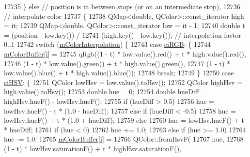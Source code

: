 \begin{DoxyCode}
12735       \} \textcolor{keywordflow}{else} \textcolor{comment}{// position is in between stops (or on an intermediate stop),}
12736              \textcolor{comment}{// interpolate color}
12737       \{
12738         QMap<double, QColor>::const\_iterator high = it;
12739         QMap<double, QColor>::const\_iterator low = it - 1;
12740         \textcolor{keywordtype}{double} t = (position - low.key()) /
12741                    (high.key() - low.key()); \textcolor{comment}{// interpolation factor 0..1}
12742         \textcolor{keywordflow}{switch} (\hyperlink{class_q_c_p_color_gradient_a028cef73d863800a9ee93ffd641cce01}{mColorInterpolation}) \{
12743         \textcolor{keywordflow}{case} \hyperlink{class_q_c_p_color_gradient_ac5dca17cc24336e6ca176610e7f77fc1a5e30f725c9cfe93999e268a9f92afbe7}{ciRGB}: \{
12744           \hyperlink{class_q_c_p_color_gradient_af8b5f0739faa5f8295154d47ce38ecff}{mColorBuffer}[\hyperlink{_comparision_pictures_2_createtest_image_8m_a6f6ccfcf58b31cb6412107d9d5281426}{i}] =
12745               qRgb((1 - t) * low.value().red() + t * high.value().red(),
12746                    (1 - t) * low.value().green() + t * high.value().green(),
12747                    (1 - t) * low.value().blue() + t * high.value().blue());
12748           \textcolor{keywordflow}{break};
12749         \}
12750         \textcolor{keywordflow}{case} \hyperlink{class_q_c_p_color_gradient_ac5dca17cc24336e6ca176610e7f77fc1af14ae62fcae11ecc07234eeaec5856cb}{ciHSV}: \{
12751           QColor lowHsv = low.value().toHsv();
12752           QColor highHsv = high.value().toHsv();
12753           \textcolor{keywordtype}{double} hue = 0;
12754           \textcolor{keywordtype}{double} hueDiff = highHsv.hueF() - lowHsv.hueF();
12755           \textcolor{keywordflow}{if} (hueDiff > 0.5)
12756             hue = lowHsv.hueF() - t * (1.0 - hueDiff);
12757           \textcolor{keywordflow}{else} \textcolor{keywordflow}{if} (hueDiff < -0.5)
12758             hue = lowHsv.hueF() + t * (1.0 + hueDiff);
12759           \textcolor{keywordflow}{else}
12760             hue = lowHsv.hueF() + t * hueDiff;
12761           \textcolor{keywordflow}{if} (hue < 0)
12762             hue += 1.0;
12763           \textcolor{keywordflow}{else} \textcolor{keywordflow}{if} (hue >= 1.0)
12764             hue -= 1.0;
12765           \hyperlink{class_q_c_p_color_gradient_af8b5f0739faa5f8295154d47ce38ecff}{mColorBuffer}[\hyperlink{_comparision_pictures_2_createtest_image_8m_a6f6ccfcf58b31cb6412107d9d5281426}{i}] =
12766               QColor::fromHsvF(
12767                   hue,
12768                   (1 - t) * lowHsv.saturationF() + t * highHsv.saturationF(),

\end{DoxyCode}
